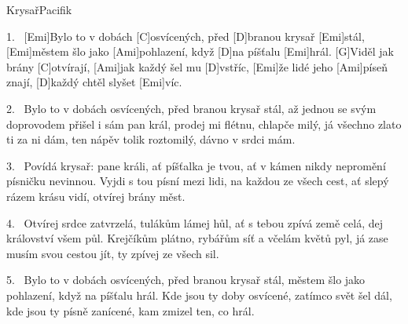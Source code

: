 \begin{song}{Krysař}{Pacifik}

\begin{xverse}{1.~}
[Emi]Bylo to v dobách [C]osvícených, před [D]branou krysař [Emi]stál,
[Emi]městem šlo jako [Ami]pohlazení, když [D]na píšťalu [Emi]hrál.
[G]Viděl jak brány [C]otvírají, [Ami]jak každý šel mu [D]vstříc,
[Emi]{že} lidé jeho [Ami]píseň znají, [D]každý chtěl slyšet [Emi]víc.
\end{xverse}


\begin{xverse}{2.~}
Bylo to v dobách osvícených, před branou krysař stál,
až jednou se svým doprovodem přišel i sám pan král,
prodej mi flétnu, chlapče milý, já všechno zlato ti za ni dám,
ten nápěv tolik roztomilý, dávno v srdci mám.
\end{xverse}


\begin{xverse}{3.~}
Povídá krysař: pane králi, ať píšťalka je tvou,
ať v kámen nikdy nepromění písničku nevinnou.
Vyjdi s tou písní mezi lidi, na každou ze všech cest,
ať slepý rázem krásu vidí, otvírej brány měst.
\end{xverse}


\begin{xverse}{4.~}
Otvírej srdce zatvrzelá, tulákům lámej hůl,
ať s tebou zpívá země celá, dej království všem půl.
Krejčíkům plátno, rybářům síť a včelám květů pyl,
já zase musím svou cestou jít, ty zpívej ze všech sil.
\end{xverse}


\begin{xverse}{5.~}
Bylo to v dobách osvícených, před branou krysař stál,
městem šlo jako pohlazení, když na píšťalu hrál.
Kde jsou ty doby osvícené, zatímco svět šel dál,
kde jsou ty písně zanícené, kam zmizel ten, co hrál.
\end{xverse}
\end{song}


